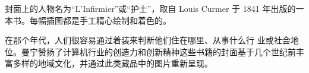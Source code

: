 封面上的人物名为“L’Infirmier”或“护士”，取自 Louis Curmer 于 1841 年出版的一本书。每幅插图都是手工精心绘制和着色的。

在那个年代，人们很容易通过着装来判断他们住在哪里、从事什么行 业或社会地位。曼宁赞扬了计算机行业的创造力和创新精神这些书籍的封面基于几个世纪前丰富多样的地域文化，并通过此类藏品中的图片重新呈现。
